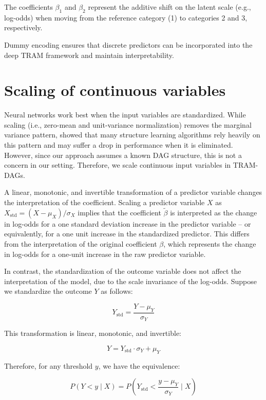 The coefficients $\beta_1$ and $\beta_2$ represent the additive shift on the latent scale (e.g., log-odds) when moving from the reference category (1) to categories 2 and 3, respectively.

Dummy encoding ensures that discrete predictors can be incorporated into the deep TRAM framework and maintain interpretability.



\section{Scaling of continuous variables} \label{sec:scaling_continuous_variables}



Neural networks work best when the input variables are standardized. While scaling (i.e., zero-mean and unit-variance normalization) removes the marginal variance pattern, \citet{reisach2021} showed that many structure learning algorithms rely heavily on this pattern and may suffer a drop in performance when it is eliminated. However, since our approach assumes a known DAG structure, this is not a concern in our setting. Therefore, we scale continuous input variables in TRAM-DAGs.

A linear, monotonic, and invertible transformation of a predictor variable changes the interpretation of the coefficient. Scaling a predictor variable $X$ as $X_{\text{std}} = (X - \mu_X) / \sigma_X$ implies that the coefficient $\tilde{\beta}$ is interpreted as the change in log-odds for a one standard deviation increase in the predictor variable -- or equivalently, for a one unit increase in the standardized predictor. This differs from the interpretation of the original coefficient $\beta$, which represents the change in log-odds for a one-unit increase in the raw predictor variable.


In contrast, the standardization of the outcome variable does not affect the interpretation of the model, due to the scale invariance of the log-odds. Suppose we standardize the outcome $Y$ as follows:

\[
Y_{\text{std}} = \frac{Y - \mu_Y}{\sigma_Y}
\]

This transformation is linear, monotonic, and invertible:

\[
Y = Y_{\text{std}} \cdot \sigma_Y + \mu_Y
\]

Therefore, for any threshold $y$, we have the equivalence:

\[
P(Y < y \mid X) = P\left(Y_{\text{std}} < \frac{y - \mu_Y}{\sigma_Y} \mid X\right)
\]


